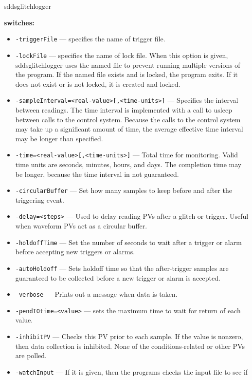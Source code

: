 \begin{sddsprog}{sddsglitchlogger}
\item \textbf{switches:}
\begin{itemize}

  \item {\tt -triggerFile} --- specifies the name of trigger file.
  \item {\tt -lockFile} --- specifies the name of lock file. When this option is given,
                sddsglitchlogger uses the named file to prevent running multiple versions of
                the program.  If the named file exists and is locked, the program exits.
                If it does not exist or is not locked, it is created and locked.
  \item {\tt -sampleInterval=<real-value>[,<time-units>]} --- Specifies the interval between readings.
                The time interval is implemented with a call to usleep between calls to the control system.
                Because the calls to the control system may take up a significant amount of time, the average
                effective time interval may be longer than specified.
  \item {\tt -time=<real-value>[,<time-units>]} --- Total time for monitoring. Valid time units are
                seconds, minutes, hours, and days. The completion time may be longer, because the time
                interval in not guaranteed.
  \item {\tt -circularBuffer} --- Set how many samples to keep before and after the triggering event.
  \item {\tt -delay=<steps>} --- Used to delay reading PVs after a glitch or trigger. Useful when
                waveform PVs act as a circular buffer.
  \item {\tt -holdoffTime} --- Set the number of seconds to wait after a trigger or alarm before
                accepting new triggers or alarms.
  \item {\tt -autoHoldoff} --- Sets holdoff time so that the after-trigger samples are guaranteed
                to be collected before a new trigger or alarm is accepted.
  \item {\tt -verbose} --- Prints out a message when data is taken.
  \item {\tt -pendIOtime=<value>} --- sets the maximum time to wait for return of each value.
  \item {\tt -inhibitPV} --- Checks this PV prior to each sample.  If the value is nonzero,
                then data collection is inhibited.  None of the conditions-related or other PVs are polled.
  \item {\tt -watchInput} --- If it is given, then the programs checks the input file to see if

\end{itemize}
\end{sddsprog}
